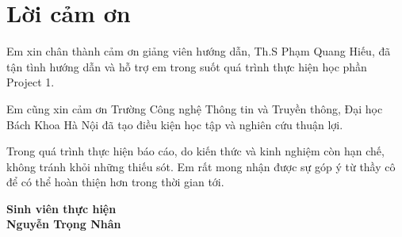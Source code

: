 
\clearpage
\section*{\centering Lời cảm ơn}

Em xin chân thành cảm ơn giảng viên hướng dẫn, Th.S Phạm Quang Hiếu, 
đã tận tình hướng dẫn và hỗ trợ em trong suốt quá trình thực hiện học phần Project 1.

Em cũng xin cảm ơn Trường Công nghệ Thông tin và Truyền thông, 
Đại học Bách Khoa Hà Nội đã tạo điều kiện học tập và nghiên cứu thuận lợi.

Trong quá trình thực hiện báo cáo, do kiến thức và kinh nghiệm còn hạn chế, 
không tránh khỏi những thiếu sót. Em rất mong nhận được sự góp ý từ thầy cô để có thể hoàn thiện hơn trong thời gian tới.

\vspace{2cm}

\begin{flushright}
\textbf{Sinh viên thực hiện} \\[2cm] %
\textbf{Nguyễn Trọng Nhân}
\end{flushright}

\clearpage